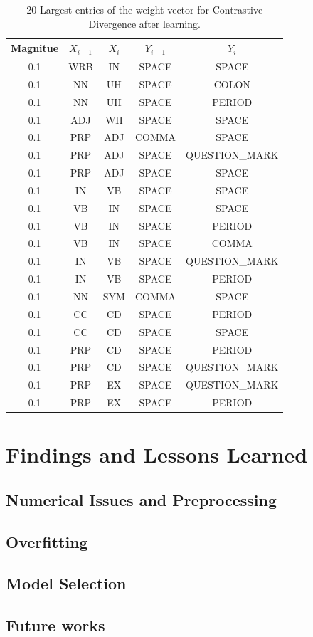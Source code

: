 \documentclass[twoside,12pt]{article}
\begin{document}
\begin{table}[H]\footnotesize
  \caption{20 Largest entries of the weight vector  for Contrastive Divergence after learning.}
\begin{center}
    \begin{tabular}{| c | c | c | c | c |}
    \hline
    \textbf{ Magnitue} & $X_{i-1}$ & $X_i$ & $Y_{i-1}$& $Y_i$ \\ \hline
0.1& WRB& IN &SPACE& SPACE\\ \hline
0.1& NN &UH &SPACE &COLON\\ \hline
0.1& NN &UH &SPACE &PERIOD\\ \hline
0.1 &ADJ &WH &SPACE &SPACE\\ \hline
0.1 &PRP &ADJ &COMMA& SPACE\\ \hline
0.1 &PRP &ADJ &SPACE &QUESTION\_MARK\\ \hline
0.1 &PRP& ADJ &SPACE &SPACE\\ \hline
0.1 &IN &VB &SPACE &SPACE\\ \hline
0.1 &VB &IN &SPACE &SPACE\\ \hline
0.1 &VB &IN &SPACE &PERIOD\\ \hline
0.1 &VB &IN &SPACE &COMMA\\ \hline
0.1 &IN &VB &SPACE &QUESTION\_MARK\\ \hline
0.1 &IN &VB &SPACE &PERIOD\\ \hline
0.1 &NN &SYM &COMMA& SPACE\\ \hline
0.1 &CC &CD &SPACE &PERIOD\\ \hline
0.1 &CC &CD &SPACE &SPACE\\ \hline
0.1 &PRP &CD& SPACE &PERIOD\\ \hline
0.1 &PRP &CD &SPACE &QUESTION\_MARK\\ \hline
0.1 &PRP &EX &SPACE &QUESTION\_MARK\\ \hline
0.1 &PRP& EX &SPACE &PERIOD\\ \hline
    \end{tabular}
    \label{tableGibbsWeights}
\end{center}
\end{table}



\section{Findings and Lessons Learned}
\subsection{Numerical Issues and Preprocessing}
\subsection{Overfitting}
\subsection{Model Selection}
\subsection{Future works}
\end{document}
